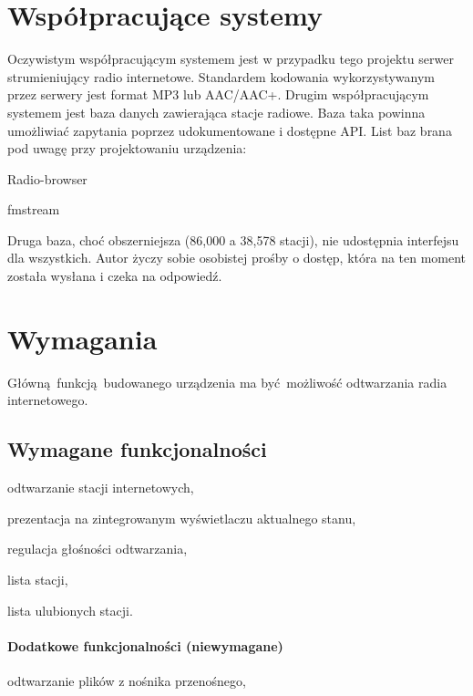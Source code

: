 \documentclass[12pt]{report}
\let\tempone\itemize
\let\temptwo\enditemize
\renewenvironment{itemize}{\tempone\setlength{\itemsep}{0cm}}{\temptwo}
\begin{document}
	\section{Współpracujące systemy}
		Oczywistym współpracującym systemem jest w przypadku tego projektu serwer strumieniujący radio internetowe. Standardem kodowania wykorzystywanym przez serwery jest format MP3 lub AAC/AAC+. Drugim współpracującym systemem jest baza danych zawierająca stacje radiowe. Baza taka powinna umożliwiać zapytania poprzez udokumentowane i dostępne API. List baz brana pod uwagę przy projektowaniu urządzenia:
		\begin{itemize}
			\item Radio-browser\textsuperscript{\cite{radio-browser}}
			\item fmstream\textsuperscript{\cite{fmstream}}
		\end{itemize}
		
		Druga baza, choć obszerniejsza (86,000 a 38,578 stacji), nie udostępnia interfejsu dla wszystkich. Autor życzy sobie osobistej prośby o dostęp, która na ten moment została wysłana i czeka na odpowiedź.
		
	\section{Wymagania}
		Główną funkcją budowanego urządzenia ma być możliwość odtwarzania radia internetowego.
		
		\subsection{Wymagane funkcjonalności}
			\begin{itemize}
				\item odtwarzanie stacji internetowych,
				\item prezentacja na zintegrowanym wyświetlaczu aktualnego stanu,
				\item regulacja głośności odtwarzania,
				\item lista stacji,
				\item lista ulubionych stacji.
			\end{itemize}
			
			\paragraph{Dodatkowe funkcjonalności (niewymagane)}
			\begin{itemize}
				\item odtwarzanie plików z nośnika przenośnego,
			\end{itemize}
		
\end{document}
